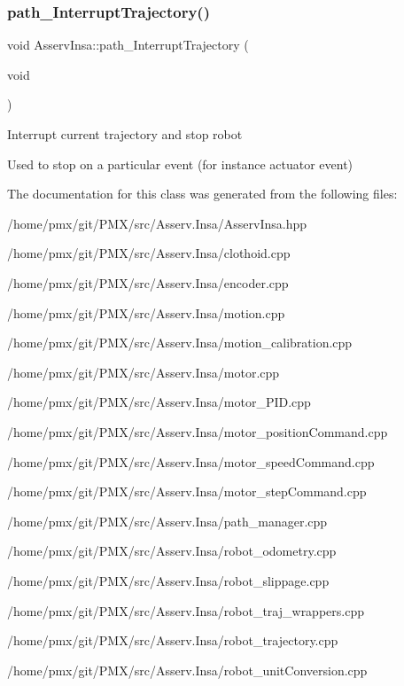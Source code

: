 \subsubsection{\texorpdfstring{path\+\_\+\+Interrupt\+Trajectory()}{path\_InterruptTrajectory()}}
{\footnotesize\ttfamily void Asserv\+Insa\+::path\+\_\+\+Interrupt\+Trajectory (\begin{DoxyParamCaption}\item[{void}]{ }\end{DoxyParamCaption})}

Interrupt current trajectory and stop robot

Used to stop on a particular event (for instance actuator event) 

The documentation for this class was generated from the following files\+:\begin{DoxyCompactItemize}
\item 
/home/pmx/git/\+P\+M\+X/src/\+Asserv.\+Insa/Asserv\+Insa.\+hpp\item 
/home/pmx/git/\+P\+M\+X/src/\+Asserv.\+Insa/clothoid.\+cpp\item 
/home/pmx/git/\+P\+M\+X/src/\+Asserv.\+Insa/encoder.\+cpp\item 
/home/pmx/git/\+P\+M\+X/src/\+Asserv.\+Insa/motion.\+cpp\item 
/home/pmx/git/\+P\+M\+X/src/\+Asserv.\+Insa/motion\+\_\+calibration.\+cpp\item 
/home/pmx/git/\+P\+M\+X/src/\+Asserv.\+Insa/motor.\+cpp\item 
/home/pmx/git/\+P\+M\+X/src/\+Asserv.\+Insa/motor\+\_\+\+P\+I\+D.\+cpp\item 
/home/pmx/git/\+P\+M\+X/src/\+Asserv.\+Insa/motor\+\_\+position\+Command.\+cpp\item 
/home/pmx/git/\+P\+M\+X/src/\+Asserv.\+Insa/motor\+\_\+speed\+Command.\+cpp\item 
/home/pmx/git/\+P\+M\+X/src/\+Asserv.\+Insa/motor\+\_\+step\+Command.\+cpp\item 
/home/pmx/git/\+P\+M\+X/src/\+Asserv.\+Insa/path\+\_\+manager.\+cpp\item 
/home/pmx/git/\+P\+M\+X/src/\+Asserv.\+Insa/robot\+\_\+odometry.\+cpp\item 
/home/pmx/git/\+P\+M\+X/src/\+Asserv.\+Insa/robot\+\_\+slippage.\+cpp\item 
/home/pmx/git/\+P\+M\+X/src/\+Asserv.\+Insa/robot\+\_\+traj\+\_\+wrappers.\+cpp\item 
/home/pmx/git/\+P\+M\+X/src/\+Asserv.\+Insa/robot\+\_\+trajectory.\+cpp\item 
/home/pmx/git/\+P\+M\+X/src/\+Asserv.\+Insa/robot\+\_\+unit\+Conversion.\+cpp\end{DoxyCompactItemize}
